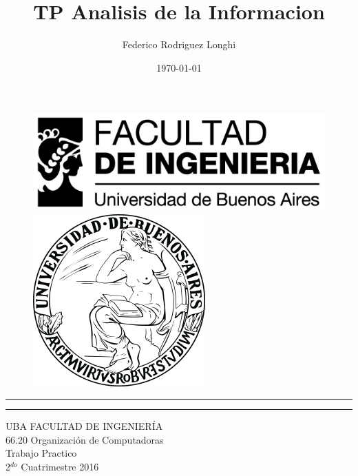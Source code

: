 \documentclass[11pt,a4paper]{article}
\begin{document}
\title{TP Analisis de la Informacion}
\author{Federico Rodriguez Longhi}		
\date{\today}

\begin{titlepage}
	
	\begin{figure}[H]
		\raggedright
		\includegraphics[scale=0.25]{logo_fiuba2}
		\hfill
		\raggedleft
		\includegraphics[scale=0.2]{logo_uba}
	\end{figure}
	\rule{\textwidth}{1pt}\par %
	\vspace{2pt}\vspace{-\baselineskip} %
	\rule{\textwidth}{0.4pt}\par %
	
	\vspace{0.05\textheight} %
	\centering %
	{\Huge UBA FACULTAD DE INGENIERÍA}\\[0.5\baselineskip]
	{\Large 66.20 Organización de Computadoras}\\[0.5\baselineskip]
	{\Huge Trabajo Practico}\\[0.75\baselineskip]
	{\Large 2$^{do}$ Cuatrimestre 2016}\\[0.5\baselineskip]
	\vspace{0.2\textheight}
	

\end{titlepage}
\end{document}

